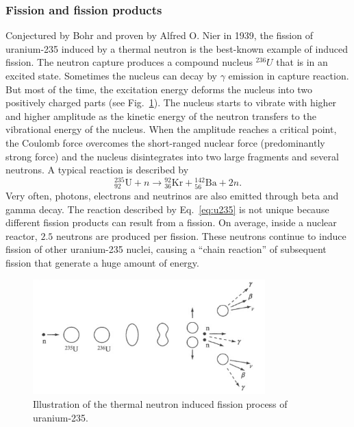 \documentclass[nofootinbib,preprint,aps]{revtex4-1}
\begin{document}
        \subsubsection{Fission and fission products}
        \label{sec:fission}
        Conjectured by Bohr and proven by Alfred O. Nier in 1939,
        the fission of uranium-235 induced by a thermal neutron
        is the best-known example of induced fission. 
        The neutron capture produces a compound nucleus ${}^{236}U$ that is in an excited state.
        Sometimes the nucleus can decay by $\gamma$ emission in capture reaction.
        But most of the time, the excitation energy deforms the nucleus into two positively charged
        parts (see Fig.~\ref{fig:fission}).
        The nucleus starts to vibrate with higher and higher amplitude as the kinetic energy of the
        neutron transfers to the vibrational energy of the nucleus.
        When the
        amplitude reaches a critical point, the Coulomb force overcomes the short-ranged nuclear
        force (predominantly strong force) and the nucleus disintegrates into two large fragments and several neutrons.
        A typical reaction is described by
        \begin{equation}
        {}^{235}_{92}\text{U} + n \rightarrow {}^{92}_{36}\text{Kr} + {}^{142}_{56}\text{Ba} + 2 n.
        \label{eq:u235}
        \end{equation}
        Very often, photons, electrons and neutrinos are also emitted through beta and gamma decay.
        The reaction described by Eq.~\ref{eq:u235} is not unique because different fission products can result
        from a fission.
        On average, inside a nuclear reactor, $2.5$ neutrons are produced per fission. These neutrons
        continue to induce fission of other uranium-235 nuclei, causing a ``chain reaction'' of subsequent
        fission that generate a huge amount of energy.\cite[chapt. 10]{l01}
        \begin{figure}[h]
            \centering
            \includegraphics[width=0.8\textwidth]{fission.png}
            \caption{Illustration of the thermal neutron induced fission process of uranium-235.\cite{l01}}
            \label{fig:fission}
        \end{figure}
\end{document}
